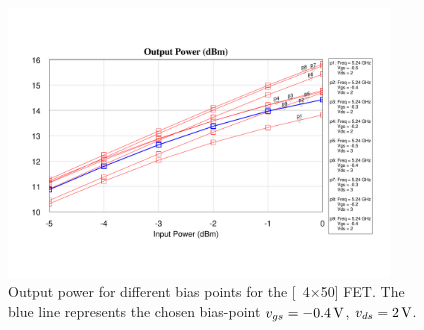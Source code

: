 			\begin{figure}[hbt!]
				\centering
				\includegraphics[trim=50 60 30 60, clip, width=0.9\textwidth]{fig/amplifiers/lo/4x50_output_power}
				\caption[Gain for different bias-points]{Output power for different bias points for the \unit[4$\times$50]{\mum} FET. The blue line represents the chosen bias-point $v_{gs}=\unit[-0.4]{V}$, $v_{ds}=\unit[2]{V}$.}\label{fig:4x50_output_power}
			\end{figure}












